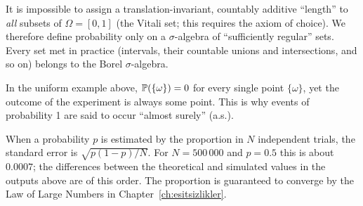 \documentclass[main.tex]{subfiles}
\begin{document}
\begin{remark}
It is impossible to assign a translation-invariant, countably additive ``length'' to \emph{all} subsets of $\Omega=[0,1]$ (the Vitali set; this requires the axiom of choice). We therefore define probability only on a $\sigma$-algebra of ``sufficiently regular'' sets. Every set met in practice (intervals, their countable unions and intersections, and so on) belongs to the Borel $\sigma$-algebra.
\end{remark}

\begin{remark}
In the uniform example above, $\P(\{\omega\})=0$ for every single point $\{\omega\}$, yet the outcome of the experiment is always some point. This is why events of probability 1 are said to occur ``almost surely'' (a.s.).
\end{remark}

\begin{remark}
When a probability $p$ is estimated by the proportion in $N$ independent trials, the standard error is $\sqrt{p(1-p)/N}$. For $N=500\,000$ and $p=0.5$ this is about $0.0007$; the differences between the theoretical and simulated values in the outputs above are of this order. The proportion is guaranteed to converge by the Law of Large Numbers in Chapter~\ref{ch:esitsizlikler}.
\end{remark}

\end{document}
